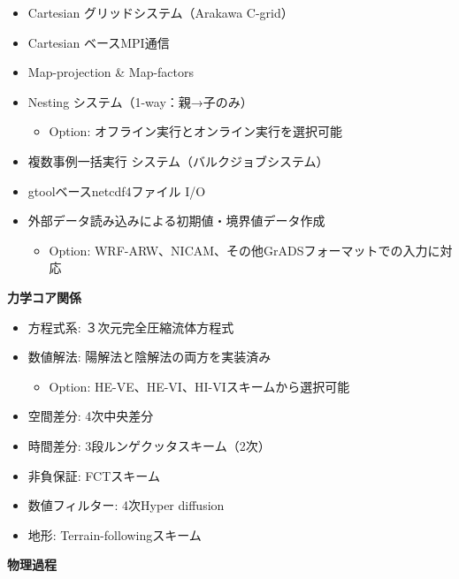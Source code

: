 
\begin{itemize}
 \item Cartesian グリッドシステム（Arakawa C-grid）
 \item Cartesian ベースMPI通信
 \item Map-projection \& Map-factors
 \item Nesting システム（1-way：親→子のみ）
   \begin{itemize}
    \item Option: オフライン実行とオンライン実行を選択可能
   \end{itemize}
 \item 複数事例一括実行 システム（バルクジョブシステム）
 \item gtoolベースnetcdf4ファイル I/O
 \item 外部データ読み込みによる初期値・境界値データ作成
   \begin{itemize}
    \item Option: WRF-ARW、NICAM、その他GrADSフォーマットでの入力に対応
   \end{itemize}
\end{itemize}

{\bf 力学コア関係}

\begin{itemize}
 \item 方程式系: ３次元完全圧縮流体方程式
 \item 数値解法: 陽解法と陰解法の両方を実装済み
   \begin{itemize}
    \item Option: HE-VE、HE-VI、HI-VIスキームから選択可能
   \end{itemize}
 \item 空間差分: 4次中央差分
 \item 時間差分: 3段ルンゲクッタスキーム（2次）
 \item 非負保証: FCTスキーム
 \item 数値フィルター: 4次Hyper diffusion
 \item 地形: Terrain-followingスキーム
\end{itemize}

{\bf 物理過程}

